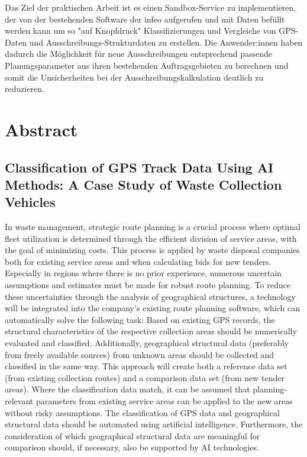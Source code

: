 \documentclass[a4paper,12pt,twoside]{scrreprt}
\begin{document}
Das Ziel der praktischen Arbeit ist es einen Sandbox-Service zu implementieren, der von der bestehenden Software der infeo aufgerufen und mit Daten befüllt werden kann um so "auf Knopfdruck" Klassifizierungen und Vergleiche von GPS-Daten und Ausschreibungs-Strukturdaten zu erstellen. Die Anwender:innen haben dadurch die Möglichkeit für neue Ausschreibungen entsprechend passende Planungsparameter aus ihren bestehenden Auftragsgebieten zu berechnen und somit die Unsicherheiten bei der Ausschreibungskalkulation deutlich zu reduzieren.

\vspace{0.5cm}


\newpage
\section*{Abstract}
\subsection*{Classification of GPS Track Data Using AI Methods: A Case Study of Waste Collection Vehicles}

In waste management, strategic route planning is a crucial process where optimal fleet utilization is determined through the efficient division of service areas, with the goal of minimizing costs. This process is applied by waste disposal companies both for existing service areas and when calculating bids for new tenders. Especially in regions where there is no prior experience, numerous uncertain assumptions and estimates must be made for robust route planning. To reduce these uncertainties through the analysis of geographical structures, a technology will be integrated into the company’s existing route planning software, which can automatically solve the following task: Based on existing GPS records, the structural characteristics of the respective collection areas should be numerically evaluated and classified. Additionally, geographical structural data (preferably from freely available sources) from unknown areas should be collected and classified in the same way. This approach will create both a reference data set (from existing collection routes) and a comparison data set (from new tender areas). Where the classification data match, it can be assumed that planning-relevant parameters from existing service areas can be applied to the new areas without risky assumptions. The classification of GPS data and geographical structural data should be automated using artificial intelligence. Furthermore, the consideration of which geographical structural data are meaningful for comparison should, if necessary, also be supported by AI technologies.
\end{document}
